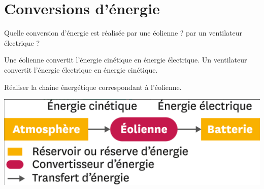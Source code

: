 \section{Conversions d'énergie}\label{ex:conversion}

\begin{questions}
	\question Quelle conversion d'énergie est réalisée par une éolienne ? par un ventilateur électrique ?
		\begin{solution}
			Une éolienne convertit l'énergie cinétique en énergie électrique. Un ventilateur convertit l'énergie électrique en énergie cinétique.
		\end{solution}
	
	\question Réaliser la chaine énergétique correspondant à l'éolienne.
		\begin{solution}
			\begin{center}
				\includegraphics[scale=0.2]{img/chaine}
			\end{center}
		\end{solution}
	
\end{questions}